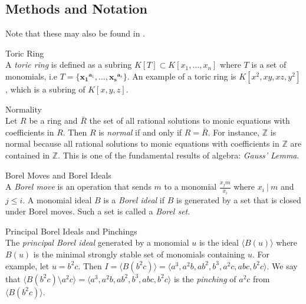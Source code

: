 \documentclass[a0, landscape]{a0poster}
\begin{document}
\begin{multicols}{4}

\section*{\color{DarkSlateBlue}Methods and Notation}

Note that these may also be found in \citep{DiPasquale2017}.

\begin{definition}{Toric Ring}\label{Toric Ring}\\
	A \emph{toric ring} is defined as a subring $K[T] \subset K[x_1, \ldots, x_n] $  where $T$ is a set of monomials, i.e $T = \{ \mathbf{x_1}^{\mathbf{a}_1}, \ldots, \mathbf{x_s}^{\mathbf{a}_s}\}$. An example of a toric ring is $K[x^2,  xy,  xz,  y^2]$, which  is a subring  of $K[x, y, z]$.
\end{definition}

\begin{definition}{Normality}\label{Normality}\\
	Let $R$ be a ring and $\bar{R}$ the set of all rational solutions to monic equations with coefficients in $R$. Then $R$ is \emph{normal} if and only if $R = \bar{R}$. For instance, $\mathbb{Z}$ is normal because all rational solutions to monic equations with coefficients in $\mathbb{Z}$ are contained in $\mathbb{Z}$. This is  one of the fundamental results of algebra: \textit{Gauss' Lemma}.
\end{definition}
\begin{definition}{Borel Moves and Borel Ideals}\label{BorelMovesAndIdeals}\\
     A \textit{Borel move} is an operation that sends $m$ to a monomial $\frac{x_j m}{x_i}$ where $ x_i \ | \ m$ and $j \leq i$. A monomial ideal $B$ is a \textit{Borel ideal} if $B$ is generated by a set that is closed under Borel moves. Such a set is called a \textit{Borel set}.
\end{definition}

\begin{definition}{Principal Borel Ideals and Pinchings}\label{PBorelsAndPinchings}\\
The \textit{principal Borel ideal} generated by a monomial $u$ is the ideal $\langle B(u) \rangle$ where $B(u)$ is the minimal strongly stable set of monomials containing $u$.
For example, let $u = b^2c$. Then $I=\langle B(b^2c)\rangle=\langle a^3,a^2b,ab^2,b^3,a^2c,abc,b^2c\rangle$. We say that $\langle B(b^2c) \setminus a^2c\rangle=\langle a^3,a^2b,ab^2,b^3,abc,b^2c\rangle$ is the \textit{pinching} of $a^2c$ from $\langle B(b^2c)\rangle$.
\end{definition}


\end{multicols}
\end{document}
